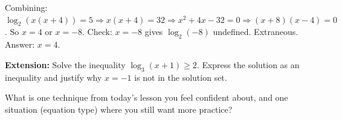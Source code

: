 \documentclass[10pt]{article}
\begin{document}
\begin{enumerate}[leftmargin=1.8em, itemsep=14pt]
\begin{teachernote}
Combining: $\log_2(x(x+4))=5 \Rightarrow x(x+4)=32 \Rightarrow x^2+4x-32=0
\Rightarrow (x+8)(x-4)=0$. So $x=4$ or $x=-8$.
Check: $x=-8$ gives $\log_2(-8)$ undefined. Extraneous. Answer: $x=4$.
\end{teachernote}

\end{enumerate}

\vspace{0.1in}

\begin{extensionbox}
\textbf{Extension:} Solve the inequality $\log_3(x+1) \geq 2$. Express the solution as an
inequality and justify why $x = -1$ is not in the solution set.

\end{extensionbox}

\vspace{0.1in}

\begin{reflectionbox}
What is one technique from today's lesson you feel confident about, and one situation
(equation type) where you still want more practice?

\end{reflectionbox}
\end{document}
